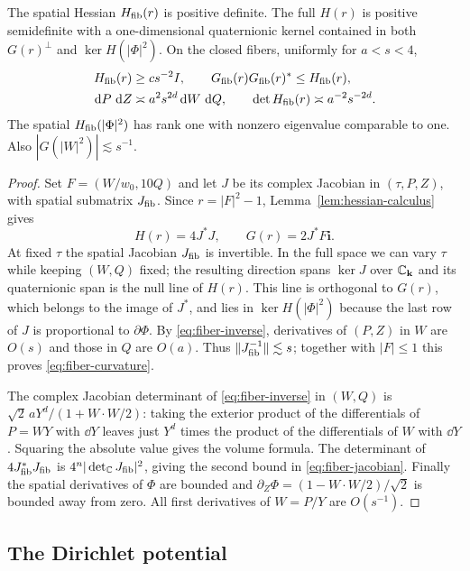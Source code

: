 \begin{lemma}\label{lem:fiber-geometry}
The spatial Hessian $H_{\rm fib}(r)$ is positive definite. The full
$H(r)$ is positive semidefinite with a one-dimensional quaternionic
kernel contained in both $G(r)^\perp$ and $\ker H(|\Phi|^2)$. On the
closed fibers, uniformly for $a<s<4$,
\begin{align}
 H_{\rm fib}(r)&\ge c s^{-2}I,\qquad
 G_{\rm fib}(r)G_{\rm fib}(r)^*\le H_{\rm fib}(r),\label{eq:fiber-curvature}\\
 \,\mathrm d P\,\,\mathrm d Z&\asymp a^2s^{2d}\,\mathrm d W\,\,\mathrm d Q,\qquad
 \det H_{\rm fib}(r)\asymp a^{-2}s^{-2d}.\label{eq:fiber-jacobian}
\end{align}
The spatial $H_{\rm fib}(|\Phi|^2)$ has rank one with nonzero eigenvalue
comparable to one. Also $|G(|W|^2)|\lesssim s^{-1}$.
\end{lemma}

\begin{proof}
Set $F=(W/w_0,10Q)$ and let $J$ be its complex Jacobian in
$(\tau,P,Z)$, with spatial submatrix $J_{\rm fib}$. Since $r=|F|^2-1$,
Lemma~\ref{lem:hessian-calculus} gives
\[
 H(r)=4J^*J,\qquad G(r)=2J^*F\mathbf i .
\]
At fixed $\tau$ the spatial Jacobian $J_{\rm fib}$ is invertible.
In the full space we can vary $\tau$ while keeping $(W,Q)$ fixed;
the resulting direction spans $\ker J$ over $\mathbb C_{\mathbf k}$ and
its quaternionic span is the null line of $H(r)$. This line is
orthogonal to $G(r)$, which belongs to the image of $J^*$, and lies in
$\ker H(|\Phi|^2)$ because the last row of $J$ is proportional to
$\partial\Phi$. By
\eqref{eq:fiber-inverse}, derivatives of $(P,Z)$ in $W$ are $O(s)$
and those in $Q$ are $O(a)$. Thus $\|J_{\rm fib}^{-1}\|\lesssim s$;
together with $|F|\le1$ this proves \eqref{eq:fiber-curvature}.

The complex Jacobian determinant of \eqref{eq:fiber-inverse} in $(W,Q)$
is $\sqrt2\,aY^d/(1+W\cdot W/2)$: taking the exterior product of the
differentials of $P=WY$ with $\dd Y$ leaves just $Y^d$ times the product
of the differentials of $W$ with $\dd Y$. Squaring the absolute value
gives the volume formula. The determinant of $4J_{\rm fib}^*J_{\rm fib}$
is $4^n|\det_{\mathbb C}J_{\rm fib}|^2$, giving the second bound in
\eqref{eq:fiber-jacobian}. Finally the spatial derivatives of $\Phi$ are
bounded and $\partial_Z\Phi=(1-W\cdot W/2)/\sqrt2$ is bounded away from
zero. All first derivatives of $W=P/Y$ are $O(s^{-1})$.
\end{proof}

\subsection{The Dirichlet potential}

